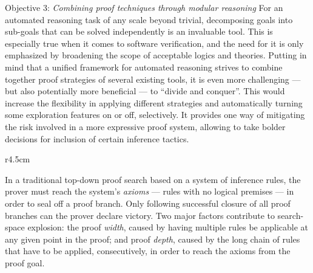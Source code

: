 \begin{paragraph}{Objective 3: {\it Combining proof techniques through modular reasoning}}
For an automated reasoning task of any scale beyond trivial, decomposing goals into sub-goals that can be solved independently is an invaluable tool.
This is especially true when it comes to software verification, and the need for it is only emphasized by broadening the scope of acceptable logics and theories.
Putting in mind that a unified framework for automated reasoning strives to combine together proof strategies of several existing tools,
it is even more challenging --- but also potentially more beneficial --- to ``divide and conquer''.
This would increase the flexibility in applying different strategies and automatically turning some exploration features on or off, selectively.
It provides one way of mitigating the risk involved in a more expressive proof system, allowing to take bolder decisions for inclusion of certain inference tactics.

\begin{wrapfigure}[8]{r}{4.5cm}
\vspace{-1em}

\end{wrapfigure}

In a traditional top-down proof search based on a system of inference rules, the prover must reach the system's \emph{axioms} --- rules with no logical premises ---
in order to seal off a proof branch.
Only following successful closure of all proof branches can the prover declare victory.
Two major factors contribute to search-space explosion:
the proof \emph{width}, caused by having multiple rules be applicable at any given point in the proof;
and proof \emph{depth}, caused by the long chain of rules that have to be applied, consecutively, in order to reach the axioms from the proof goal.


\end{paragraph}
